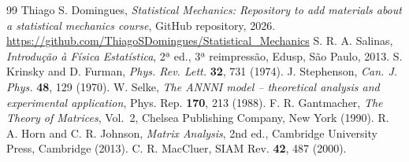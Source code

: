 \documentclass[11pt,a4paper]{article}
\begin{document}
\begin{thebibliography}{99}
Thiago S. Domingues, \textit{Statistical Mechanics: Repository to add materials about a statistical mechanics course}, GitHub repository, 2026. 
\url{https://github.com/ThiagoSDomingues/Statistical_Mechanics}
 S. R. A. Salinas, \emph{Introdução à Física Estatística}, 2ª ed., 3ª reimpressão, Edusp, São Paulo, 2013.
 S. Krinsky and D. Furman, \emph{Phys. Rev. Lett.} \textbf{32}, 731 (1974).
 J. Stephenson, \emph{Can. J. Phys.} \textbf{48}, 129 (1970).
 W. Selke, \emph{The ANNNI model -- theoretical analysis and experimental application}, Phys. Rep. \textbf{170}, 213 (1988).
F. R. Gantmacher, \textit{The Theory of Matrices}, Vol.~2, Chelsea Publishing Company, New York (1990).
R. A. Horn and C. R. Johnson, \textit{Matrix Analysis}, 2nd ed., Cambridge University Press, Cambridge (2013).
C. R. MacCluer, SIAM Rev. \textbf{42}, 487 (2000).
\end{thebibliography}
\end{document}

